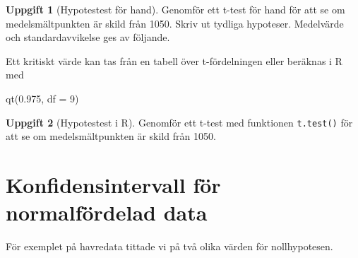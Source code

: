 \documentclass[
]{book}
\newenvironment{Shaded}{\begin{snugshade}}{\end{snugshade}}
\newcommand{\AttributeTok}[1]{\textcolor[rgb]{0.77,0.63,0.00}{#1}}
\newcommand{\DecValTok}[1]{\textcolor[rgb]{0.00,0.00,0.81}{#1}}
\newcommand{\FloatTok}[1]{\textcolor[rgb]{0.00,0.00,0.81}{#1}}
\newcommand{\FunctionTok}[1]{\textcolor[rgb]{0.00,0.00,0.00}{#1}}
\newcommand{\NormalTok}[1]{#1}
\newcommand{\SpecialCharTok}[1]{\textcolor[rgb]{0.00,0.00,0.00}{#1}}
\theoremstyle{definition}
\theoremstyle{definition}
\theoremstyle{definition}
\newtheorem{exercise}{Uppgift}[chapter]
\theoremstyle{definition}
\theoremstyle{remark}
\begin{document}
\begin{exercise}[Hypotestest för hand]

Genomför ett t-test för hand för att se om medelsmältpunkten är skild från 1050. Skriv ut tydliga hypoteser. Medelvärde och standardavvikelse ges av följande.

\begin{Shaded}
\end{Shaded}

Ett kritiskt värde kan tas från en tabell över t-fördelningen eller beräknas i R med

\begin{Shaded}
\begin{Highlighting}[]
\FunctionTok{qt}\NormalTok{(}\FloatTok{0.975}\NormalTok{, }\AttributeTok{df =} \DecValTok{9}\NormalTok{)}
\end{Highlighting}
\end{Shaded}

\end{exercise}

\begin{exercise}[Hypotestest i R]
Genomför ett t-test med funktionen \texttt{t.test()} för att se om medelsmältpunkten är skild från 1050.
\end{exercise}

\hypertarget{konfidensintervall-fuxf6r-normalfuxf6rdelad-data}{%
\section{Konfidensintervall för normalfördelad data}\label{konfidensintervall-fuxf6r-normalfuxf6rdelad-data}}

För exemplet på havredata tittade vi på två olika värden för nollhypotesen.

\begin{Shaded}
\end{Shaded}
\end{document}
